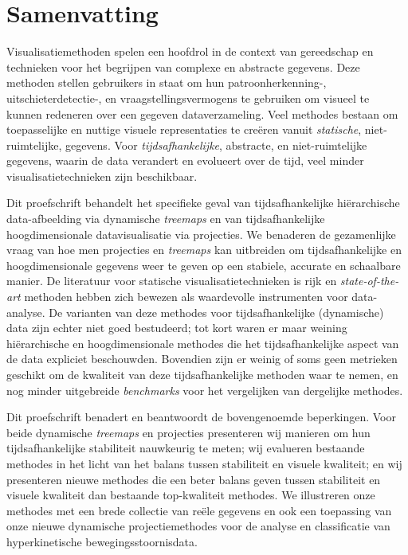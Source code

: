 \newpage


\manualmark
{} 

\chapter*{Samenvatting}

Visualisatiemethoden spelen een hoofdrol in de context van gereedschap en technieken voor het begrijpen van complexe en abstracte gegevens. Deze methoden stellen gebruikers in staat om hun patroonherkenning-, uitschieterdetectie-, en vraagstellingsvermogens te gebruiken om visueel te kunnen redeneren over een gegeven dataverzameling. Veel methodes bestaan om toepasselijke en nuttige visuele representaties te cre\"eren vanuit \emph{statische}, niet-ruimtelijke, gegevens. Voor \emph{tijdsafhankelijke}, abstracte, en niet-ruimtelijke gegevens, waarin de data verandert en evolueert over de tijd, veel minder visualisatietechnieken zijn beschikbaar.

Dit proefschrift behandelt het specifieke geval van tijdsafhankelijke hi\"erarchische data-afbeelding via dynamische \emph{treemaps} en van tijdsafhankelijke hoogdimensionale datavisualisatie via projecties. We benaderen de gezamenlijke vraag van hoe men projecties en \emph{treemaps} kan uitbreiden om tijdsafhankelijke en hoogdimensionale gegevens weer te geven op een stabiele, accurate en schaalbare manier. De literatuur voor statische visualisatietechnieken is rijk en \emph{state-of-the-art} methoden hebben zich bewezen als waardevolle instrumenten voor data-analyse. De varianten van deze methodes voor tijdsafhankelijke (dynamische) data zijn echter niet goed bestudeerd; tot kort waren er maar weining hi\"erarchische en hoogdimensionale methodes die het tijdsafhankelijke aspect van de data expliciet beschouwden. Bovendien zijn er weinig of soms geen metrieken geschikt om de kwaliteit van deze tijdsafhankelijke methoden waar te nemen, en nog minder uitgebreide \emph{benchmarks} voor het vergelijken van dergelijke methodes.

Dit proefschrift benadert en beantwoordt de bovengenoemde beperkingen. Voor beide dynamische \emph{treemaps} en projecties presenteren wij manieren om hun tijdsafhankelijke stabiliteit nauwkeurig te meten; wij evalueren bestaande methodes in het licht van het balans tussen stabiliteit en visuele kwaliteit; en wij presenteren nieuwe methodes die een beter balans geven tussen stabiliteit en visuele kwaliteit dan bestaande top-kwaliteit methodes. We illustreren onze methodes met een brede collectie van re\"ele gegevens en ook een toepassing van onze nieuwe dynamische projectiemethodes voor de analyse en classificatie van hyperkinetische bewegingsstoornisdata.


